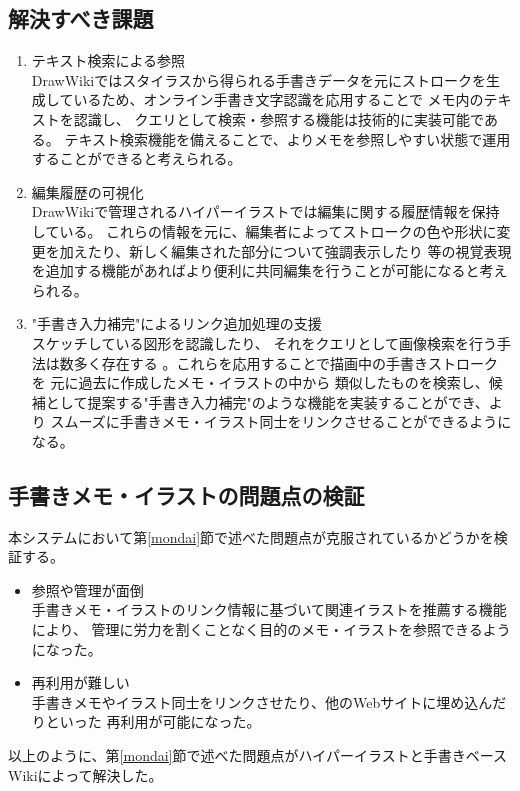 \subsection{解決すべき課題}
\begin{enumerate}
    \item テキスト検索による参照\\
    DrawWikiではスタイラスから得られる手書きデータを元にストロークを生成しているため、オンライン手書き文字認識を応用することで
    メモ内のテキストを認識し、 クエリとして検索・参照する機能は技術的に実装可能である。
    テキスト検索機能を備えることで、よりメモを参照しやすい状態で運用することができると考えられる。
    \item 編集履歴の可視化\\
    DrawWikiで管理されるハイパーイラストでは編集に関する履歴情報を保持している。
    これらの情報を元に、編集者によってストロークの色や形状に変更を加えたり、新しく編集された部分について強調表示したり
    等の視覚表現を追加する機能があればより便利に共同編集を行うことが可能になると考えられる。
    \item "手書き入力補完"によるリンク追加処理の支援\\
    スケッチしている図形を認識したり\cite{Notowidigdo2004OfflineSI}\cite{Wobbrock2007GesturesWL}、
    それをクエリとして画像検索を行う手法は数多く存在する\cite{Eitz2012SketchbasedSR}\cite{Eitz2011PhotosketcherIS}
    \cite{Chen2009Sketch2PhotoII}。これらを応用することで描画中の手書きストロークを 元に過去に作成したメモ・イラストの中から
    類似したものを検索し、候補として提案する"手書き入力補完"のような機能を実装することができ、より
    スムーズに手書きメモ・イラスト同士をリンクさせることができるようになる。
\end{enumerate}

\subsection{手書きメモ・イラストの問題点の検証}
本システムにおいて第\ref{mondai}節で述べた問題点が克服されているかどうかを検証する。
\begin{itemize}
    \item 参照や管理が面倒\\
    手書きメモ・イラストのリンク情報に基づいて関連イラストを推薦する機能により、
    管理に労力を割くことなく目的のメモ・イラストを参照できるようになった。
    \item 再利用が難しい\\
    手書きメモやイラスト同士をリンクさせたり、他のWebサイトに埋め込んだりといった
    再利用が可能になった。
\end{itemize}
以上のように、第\ref{mondai}節で述べた問題点がハイパーイラストと手書きベースWikiによって解決した。